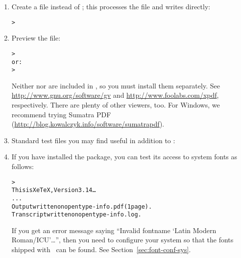 \documentclass{article}
\begin{document}
\begin{enumerate}
\item Create a  file instead of \dvi{}; this processes the
 file and writes  directly:
\begin{alltt}
> 
\end{alltt}

\item Preview the  file:
\begin{alltt}
> 
\textrm{or:}
> 
\end{alltt}
Neither  nor  are included in \TL{}, so you
must install them separately.  See \url{http://www.gnu.org/software/gv}
and \url{http://www.foolabs.com/xpdf}, respectively.  There are plenty
of other  viewers, too.  For Windows, we recommend trying
Sumatra PDF (\url{http://blog.kowalczyk.info/software/sumatrapdf}).

\item Standard test files you may find useful in addition to
:


\item If you have installed the  package, you can test
its access to system fonts as follows:
\begin{alltt}
> 
This is XeTeX, Version 3.14\dots
...
Output written on opentype-info.pdf (1 page).
Transcript written on opentype-info.log.
\end{alltt}

If you get an error message saying ``Invalid fontname `Latin Modern
Roman/ICU'\dots'', then you need to configure your system so that the
fonts shipped with \TL\ can be found.  See
Section~\ref{sec:font-conf-sys}.

\end{enumerate}
\end{document}
